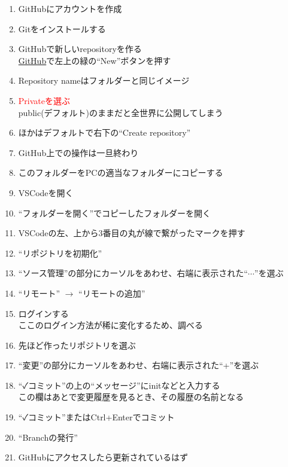 \documentclass[uplatex, a4paper, dvipdfmx, 12pt]{jsreport}
\begin{document}
		\begin{enumerate}
			\item GitHubにアカウントを作成
			\item Gitをインストールする
			\item GitHubで新しいrepositoryを作る\\
					\href{https://github.co.jp/}{GitHub}で左上の緑の``New''ボタンを押す
			\item Repository nameはフォルダーと同じイメージ
			\item {\Large\textcolor{red}{Privateを選ぶ}}\\
					public(デフォルト)のままだと全世界に公開してしまう
			\item ほかはデフォルトで右下の``Create repository''
			\item GitHub上での操作は一旦終わり
			\item このフォルダーをPCの適当なフォルダーにコピーする
			\item VSCodeを開く
			\item ``フォルダーを開く''でコピーしたフォルダーを開く
			\item VSCodeの左、上から3番目の丸が線で繋がったマークを押す
			\item ``リポジトリを初期化''
			\item ``ソース管理''の部分にカーソルをあわせ、右端に表示された``$\cdots$''を選ぶ
			\item ``リモート'' $\to$ ``リモートの追加''
			\item ログインする\\
					ここのログイン方法が稀に変化するため、調べる
			\item 先ほど作ったリポジトリを選ぶ
			\item ``変更''の部分にカーソルをあわせ、右端に表示された``+''を選ぶ
			\item ``✓コミット''の上の``メッセージ''にinitなどと入力する\\
					この欄はあとで変更履歴を見るとき、その履歴の名前となる
			\item ``✓コミット''またはCtrl+Enterでコミット
			\item ``Branchの発行''
			\item GitHubにアクセスしたら更新されているはず
		\end{enumerate}
\end{document}
